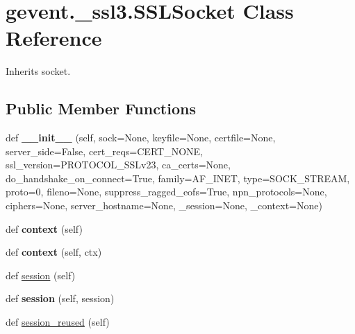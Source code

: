 \hypertarget{classgevent_1_1__ssl3_1_1_s_s_l_socket}{}\section{gevent.\+\_\+ssl3.\+S\+S\+L\+Socket Class Reference}
\label{classgevent_1_1__ssl3_1_1_s_s_l_socket}


Inherits socket.

\subsection*{Public Member Functions}
\begin{DoxyCompactItemize}
\item 
\mbox{\label{classgevent_1_1__ssl3_1_1_s_s_l_socket_a82af1a0fa2a5cb8cddf864f06633c366}} 
def {\bfseries \+\_\+\+\_\+init\+\_\+\+\_\+} (self, sock=None, keyfile=None, certfile=None, server\+\_\+side=False, cert\+\_\+reqs=C\+E\+R\+T\+\_\+\+N\+O\+NE, ssl\+\_\+version=P\+R\+O\+T\+O\+C\+O\+L\+\_\+\+S\+S\+Lv23, ca\+\_\+certs=None, do\+\_\+handshake\+\_\+on\+\_\+connect=True, family=A\+F\+\_\+\+I\+N\+ET, type=S\+O\+C\+K\+\_\+\+S\+T\+R\+E\+AM, proto=0, fileno=None, suppress\+\_\+ragged\+\_\+eofs=True, npn\+\_\+protocols=None, ciphers=None, server\+\_\+hostname=None, \+\_\+session=None, \+\_\+context=None)
\item 
\mbox{\label{classgevent_1_1__ssl3_1_1_s_s_l_socket_a48ab6ecbf6420fc558ec87f3f3015109}} 
def {\bfseries context} (self)
\item 
\mbox{\label{classgevent_1_1__ssl3_1_1_s_s_l_socket_abf0170825fafaf7d191327d3d9f9eac2}} 
def {\bfseries context} (self, ctx)
\item 
def \hyperlink{classgevent_1_1__ssl3_1_1_s_s_l_socket_ae1b9bcf22ac37c8779c1efc923377b80}{session} (self)
\item 
\mbox{\label{classgevent_1_1__ssl3_1_1_s_s_l_socket_a14057db0d1e2695d168253c5d5d4c53b}} 
def {\bfseries session} (self, session)
\item 
def \hyperlink{classgevent_1_1__ssl3_1_1_s_s_l_socket_a7a93424c8d33b6ca28f227c4ed862b5d}{session\+\_\+reused} (self)
\item 

\end{DoxyCompactItemize}
